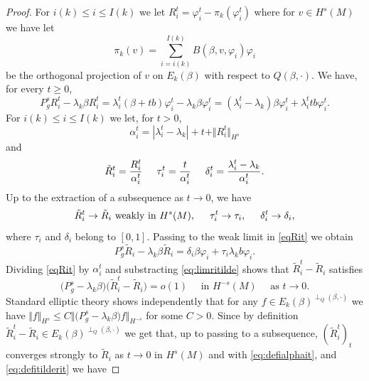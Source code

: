 \documentclass[10pt]{amsart}
\numberwithin{equation}{section}
\newcommand{\vp}{\varphi}
\theoremstyle{plain}
\theoremstyle{remark}
\begin{document}
\begin{proof}
\medskip 

For $i(k) \leq i \leq I(k)$ we let $R_i^t = \vp_i^t - \pi_k(\vp_i^t) $ where for $v\in H^s(M)$ we have let
$$ \pi_k(v) =  \sum_{i=i(k)}^{I(k)} B(\beta,v,\vp_i) \vp_i $$
be the orthogonal projection of $v$ on $E_k(\beta)$ with respect to $Q(\beta,\cdot)$. We have, for every $t \ge 0$,
\begin{equation} \label{eqRit}
 P_g^s R_i^t  - \lambda_k \beta R_i^t = \lambda_i^t (\beta + tb) \vp_i^t - \lambda_k \beta \vp_i^t = (\lambda_i^t - \lambda_k) \beta \vp_i^t + \lambda_i^t tb \vp_i^t . 
 \end{equation}
For $i(k) \le i \le I(k)$ we let, for $t >0$, 
\begin{equation} \label{eq:defialphait} \alpha_i^t = \left\vert \lambda_i^t - \lambda_k \right\vert + t + \Vert R_i^t \Vert_{H^s} \end{equation}
and
\begin{equation} \label{eq:defitilderit} \tilde{R}_i^t = \frac{R_i^t}{\alpha_i^t} \hspace{5mm} \tau_i^t = \frac{t}{\alpha_i^t} \hspace{5mm} \delta_i^t = \frac{\lambda_i^t - \lambda_k}{\alpha_i^t}. \end{equation}
Up to the extraction of a subsequence as $t\to 0$, we have
$$ \tilde{R}_i^t \to \tilde{R}_i \text{ weakly in } H^s(M), \hspace{5mm} \tau_i^t \to \tau_i, \hspace{5mm} \delta_i^t \to \delta_i,$$
where $\tau_i$ and $\delta_i$ belong to $[0,1]$. Passing to the weak limit in \eqref{eqRit} we obtain
\begin{equation} \label{eq:limritilde} P_g^s \tilde{R}_i - \lambda_k \beta  \tilde{R}_i = \delta_i \beta \vp_i + \tau_i \lambda_k b \vp_i. \end{equation}
Dividing \eqref{eqRit} by $\alpha_i^t$ and substracting \eqref{eq:limritilde} shows that $ \tilde{R}_i^t - \tilde{R}_i$ satisfies 
$$ \big( P_g^s - \lambda_k \beta \big) \big(  \tilde{R}_i^t - \tilde{R}_i \big) = o(1) \quad \text{ in } H^{-s}(M) \quad \text{ as } t \to 0. $$
Standard elliptic theory shows independently that for any $f \in E_k(\beta)^{\perp_Q(\beta, \cdot)}$ we have $\Vert f \Vert_{H^s} \le C \Vert \big( P_g^s - \lambda_k \beta \big) f \Vert_{H^{-s}}$ for some $C>0$. Since by definition $ \tilde{R}_i^t - \tilde{R}_i  \in E_k(\beta)^{\perp_Q(\beta, \cdot)}$ we get that, up to passing to a subsequence, $(\tilde{R}_i^t)_t$ converges strongly to $\tilde{R}_i$ as $t\to 0$ in $H^s(M)$ and with \eqref{eq:defialphait}, and \eqref{eq:defitilderit} we have 

\end{proof}
\end{document}
